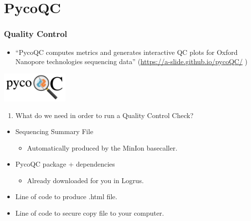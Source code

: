 \documentclass[
]{book}
\providecommand{\tightlist}{%
  \setlength{\itemsep}{0pt}\setlength{\parskip}{0pt}}
\begin{document}
\hypertarget{pycoqc}{%
\chapter{PycoQC}\label{pycoqc}}

\hypertarget{quality-control}{%
\subsection*{Quality Control}\label{quality-control}}

\begin{itemize}
\tightlist
\item
  ``PycoQC computes metrics and generates interactive QC plots for Oxford Nanopore technologies sequencing data'' (\url{https://a-slide.github.io/pycoQC/} )
\end{itemize}

\includegraphics[width=0.25\textwidth,height=\textheight]{Figures/Pyco2.png}

\begin{enumerate}
\def\labelenumi{\arabic{enumi}.}
\tightlist
\item
  What do we need in order to run a Quality Control Check?
\end{enumerate}

\begin{itemize}
\tightlist
\item
  Sequencing Summary File

  \begin{itemize}
  \tightlist
  \item
    Automatically produced by the MinIon basecaller.
  \end{itemize}
\item
  PycoQC package + dependencies

  \begin{itemize}
  \tightlist
  \item
    Already downloaded for you in Logrus.
  \end{itemize}
\item
  Line of code to produce .html file.
\item
  Line of code to secure copy file to your computer.
\end{itemize}
\end{document}
